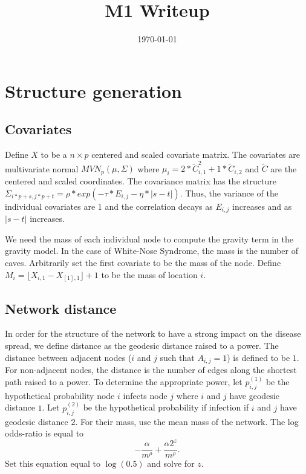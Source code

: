 \documentclass[11pt]{article}
\date{\today}
\title{M1 Writeup}
\begin{document}
\maketitle
\tableofcontents


\section{Structure generation}
\label{sec-1}

\subsection{Covariates}
\label{sec-1-1}

Define $X$ to be a $n \times p$ centered and scaled covariate matrix.
The covariates are multivariate normal $MVN_p(\mu,\Sigma)$ where
$\mu_i = 2*\widetilde{C}_{i,1}^2 + 1*\widetilde{C}_{i,2}$ and
$\widetilde{C}$ are the centered and scaled coordinates.  The
covariance matrix has the structure $\Sigma_{i*p + s, j*p + t} =
\rho * exp(-\tau * E_{i,j} - \eta*|s-t|)$.  Thus, the variance of the
individual covariates are $1$ and the correlation decays as $E_{i,j}$
increases and as $|s-t|$ increases.

We need the mass of each individual node to compute the gravity term
in the gravity model.  In the case of White-Nose Syndrome, the mass is
the number of caves.  Arbitrarily set the first covariate to be the
mass of the node.  Define $M_i = \lfloor X_{i,1} - X_{[1],1} \rfloor +
1$ to be the mass of location $i$.


\subsection{Network distance}
\label{sec-1-2}

In order for the structure of the network to have a strong impact on
the disease spread, we define distance as the geodesic distance raised
to a power.  The distance between adjacent nodes ($i$ and $j$ such
that $A_{i,j} = 1$) is defined to be $1$.  For non-adjacent nodes, the
distance is the number of edges along the shortest path raised to a
power.  To determine the appropriate power, let $p^{(1)}_{i,j}$ be the
hypothetical probability node $i$ infects node $j$ where $i$ and $j$
have geodesic distance $1$.  Let $p^{(2)}_{i,j}$ be the hypothetical
probability if infection if $i$ and $j$ have geodesic distance $2$.
For their mass, use the mean mass of the network.  The log odds-ratio
is equal to
\begin{equation*}
  - \frac{\alpha}{m^\rho} + \frac{\alpha2^z}{m^\rho}.
\end{equation*}
Set this equation equal to $\log(0.5)$ and solve for $z$.
\end{document}
